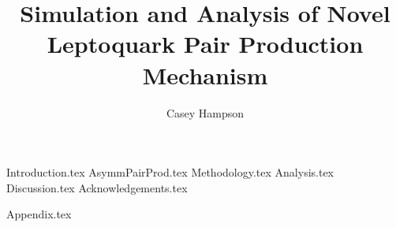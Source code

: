 \documentclass[titlepage]{article}
\title{Simulation and Analysis of Novel Leptoquark Pair Production Mechanism}
\author{Casey Hampson}
\begin{document}
    \maketitle
    \tableofcontents
    \pagebreak

    
    {Introduction.tex}
    {AsymmPairProd.tex}
    {Methodology.tex}
    {Analysis.tex}
    {Discussion.tex}
    {Acknowledgements.tex}


    \pagebreak
    \appendix
    {Appendix.tex}

    \pagebreak
    
    
    
\end{document}

